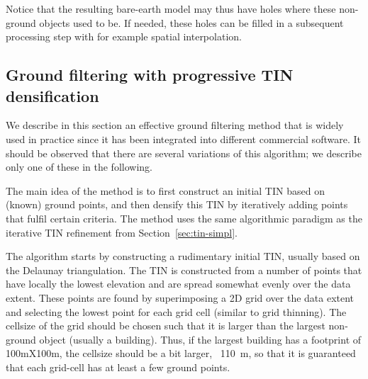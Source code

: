 %

Notice that the resulting bare-earth model may thus have holes where these non-ground objects used to be.
If needed, these holes can be filled in a subsequent processing step with for example spatial interpolation.


%
\subsection{Ground filtering with progressive TIN densification}%

We describe in this section an effective ground filtering method that is widely used in practice since it has been integrated into different commercial software.
It should be observed that there are several variations of this algorithm; we describe only one of these in the following.

%

The main idea of the method is to first construct an initial TIN based on (known) ground points, and then densify this TIN by iteratively adding points that fulfil certain criteria.
The method uses the same algorithmic paradigm as the iterative TIN refinement from Section~\ref{sec:tin-simpl}.

%

The algorithm starts by constructing a rudimentary initial TIN, usually based on the Delaunay triangulation. 
The TIN is constructed from a number of points that have locally the lowest elevation and are spread somewhat evenly over the data extent.
These points are found by superimposing a 2D grid over the data extent and selecting the lowest point for each grid cell (similar to grid thinning).
The cellsize of the grid should be chosen such that it is larger than the largest non-ground object (usually a building).
Thus, if the largest building has a footprint of 100mX100m, the cellsize should be a bit larger, \eg\ \qty{110}{m}, so that it is guaranteed that each grid-cell has at least a few ground points.

%


